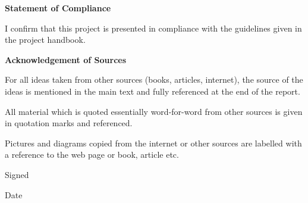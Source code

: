 \thispagestyle{plain}
\mbox{}
\vspace{30mm}
\begin{center}
    \textbf{Statement of Compliance}
\end{center}
I confirm that this project is presented in compliance with the guidelines
given in the project handbook.
\vspace{15mm}
\begin{center}
    \textbf{Acknowledgement of Sources}
\end{center}
For all ideas taken from other sources (books, articles, internet),
the source of the ideas is mentioned in the main text and fully
referenced at the end of the report.

All material which is quoted essentially word-for-word from
other sources is given in quotation marks and referenced.

Pictures and diagrams copied from the internet or other sources
are labelled with a reference to the web page or book, article etc.

\vspace{15mm}

Signed\hspace{2mm}\underline{\hspace{40mm}}

Date\hspace{5mm}\underline{\hspace{40mm}}
\newpage